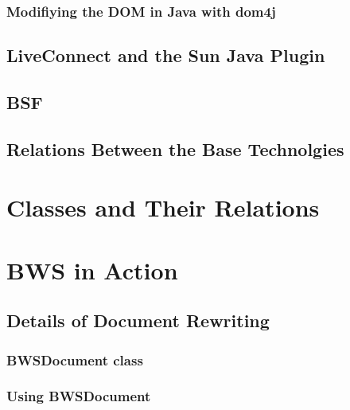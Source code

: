    \subsubsection{Modifiying the DOM in Java with dom4j}
   
    
    
  \subsection{LiveConnect and the Sun Java Plugin}
  
   
   
  \subsection{BSF}
  
   
  
  \subsection{Relations Between the Base Technolgies}
   
   
   
 \section{Classes and Their Relations}
 
  
   
 \section{BWS in Action}
  
  
  
  \subsection{Details of Document Rewriting}

   

   \subsubsection{BWSDocument class}
    
    
     
   \subsubsection{Using BWSDocument}

